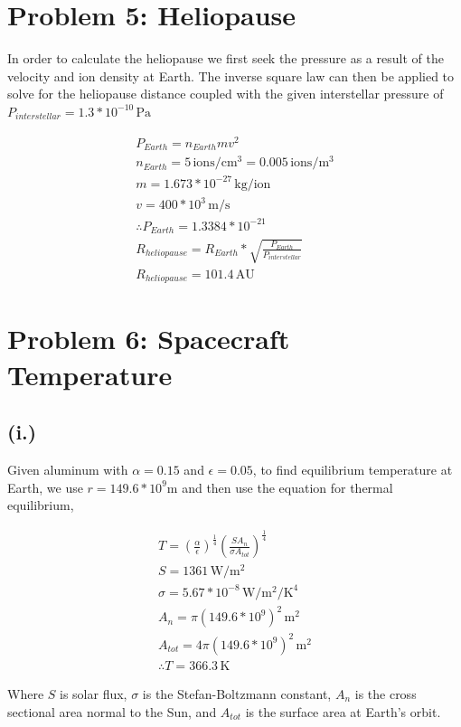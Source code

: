 \documentclass[11pt]{article}
\begin{document}
\section*{Problem 5: Heliopause}
In order to calculate the heliopause we first seek the pressure as a result 
of the velocity and ion density at Earth. The inverse square law can then be 
applied to solve for the heliopause distance coupled with the given interstellar
pressure of $P_{interstellar} = 1.3*10^{-10} \, \mathrm{Pa}$ 

\[
\begin{gathered}
P_{Earth} = n_{Earth}mv^2 \\
n_{Earth} = 5 \, \mathrm{ions/cm^3} = 0.005 \, \mathrm{ions/m^3}\\
m = 1.673*10^{-27} \, \mathrm{kg/ion}\\
v = 400*10^3 \, \mathrm{m/s} \\
\therefore P_{Earth} = 1.3384*10^{-21} \\
R_{heliopause} = R_{Earth}*\sqrt{\frac{P_{Earth}}{P_{interstellar}}} \\
\boxed{R_{heliopause} = 101.4 \, \mathrm{AU}}
\end{gathered}
\]


\section*{Problem 6: Spacecraft Temperature}

\subsection*{(i.)}
Given aluminum with $\alpha = 0.15$ and $\epsilon = 0.05$,
to find equilibrium temperature at Earth, we use $r = 149.6*10^9 \mathrm{m}$
and then use the equation for thermal equilibrium,

\[
\begin{gathered}
T = (\frac{\alpha}{\epsilon})^{\frac{1}{4}} (\frac{SA_n}{\sigma A_{tot}})^{\frac{1}{4}} \\
S = 1361 \, \mathrm{W/m^2} \\
\sigma = 5.67*10^{-8} \, \mathrm{W/m^2/K^4}\\
A_n = \pi (149.6*10^9)^2 \, \mathrm{m^2} \\
A_{tot} = 4\pi(149.6*10^9)^2 \, \mathrm{m^2} \\
\boxed{\therefore T = 366.3 \, \mathrm{K}}
\end{gathered}
\]

Where $S$ is solar flux, $\sigma$ is the Stefan-Boltzmann constant, $A_n$ is the 
cross sectional area normal to the Sun, and $A_{tot}$ is the surface area 
at Earth's orbit.
\end{document}
